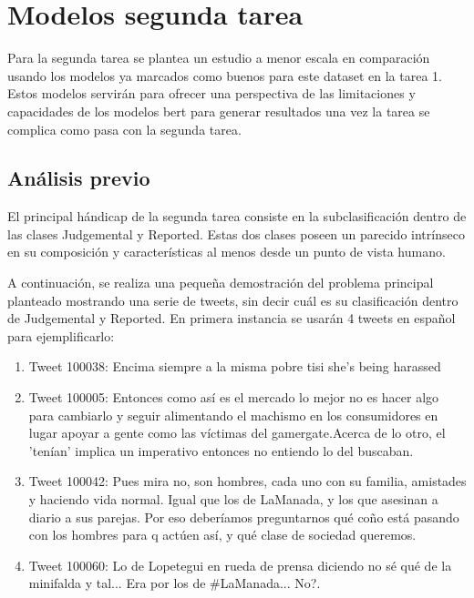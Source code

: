 \section{Modelos segunda tarea}

Para la segunda tarea se plantea un estudio a menor escala en comparación usando los modelos ya marcados como buenos para este dataset en la tarea 1. Estos modelos servirán para ofrecer una perspectiva de las limitaciones y capacidades de los modelos bert para generar resultados una vez la tarea se complica como pasa con la segunda tarea.


\subsection{Análisis previo}
El principal hándicap de la segunda tarea consiste en la subclasificación dentro de las clases Judgemental y Reported. Estas dos clases poseen un parecido intrínseco en su composición y características al menos desde un punto de vista humano.

A continuación, se realiza una pequeña demostración del problema principal planteado mostrando una serie de tweets, sin decir cuál es su clasificación dentro de Judgemental y Reported. En primera instancia se usarán 4 tweets en español para ejemplificarlo: 

\begin{enumerate}
        \item Tweet 100038: Encima siempre a la misma pobre tisi she’s being harassed
        \item Tweet 100005: Entonces como así es el mercado lo mejor no es hacer algo para cambiarlo y seguir alimentando el machismo en los consumidores en lugar apoyar a gente como las víctimas del gamergate.Acerca de lo otro, el 'tenían' implica un imperativo entonces no entiendo lo del buscaban.
        \item Tweet 100042: Pues mira no, son hombres, cada uno con su familia, amistades y haciendo vida normal. Igual que los de LaManada, y los que asesinan a diario a sus parejas. Por eso deberíamos preguntarnos qué coño está pasando con los hombres para q actúen así, y qué clase de sociedad queremos.
        \item Tweet 100060: Lo de Lopetegui en rueda de prensa diciendo no sé qué de la minifalda y tal... Era por los de \#LaManada... No?.
\end{enumerate}


